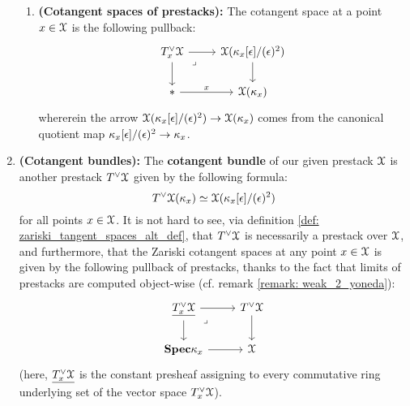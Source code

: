 \begin{definition}
\begin{enumerate}
\begin{enumerate}
                                \item \textbf{(Cotangent spaces of prestacks):} The cotangent space at a point $x \in \mathcal{X}$ is the following pullback:
                                    $$
                                        \begin{tikzcd}
                                        	{T^{\vee}_x\calX} & {\calX(\kappa_x[\e]/(\e)^2)} \\
                                        	{*} & {\calX(\kappa_x)}
                                        	\arrow["x", from=2-1, to=2-2]
                                        	\arrow[from=1-1, to=2-1]
                                        	\arrow[from=1-1, to=1-2]
                                        	\arrow[from=1-2, to=2-2]
                                        	\arrow["\lrcorner"{anchor=center, pos=0.125}, draw=none, from=1-1, to=2-2]
                                        \end{tikzcd}
                                    $$
                                whererein the arrow $\mathcal{X}(\kappa_x[\epsilon]/(\epsilon)^2) \to \mathcal{X}(\kappa_x)$ comes from the canonical quotient map $\kappa_x[\epsilon]/(\epsilon)^2 \to \kappa_x$.
                            \end{enumerate}
                        \item \textbf{(Cotangent bundles):} The \textbf{cotangent bundle} of our given prestack $\mathcal{X}$ is another prestack $T^{\vee}\mathcal{X}$ given by the following formula:
                            $$T^{\vee}\mathcal{X}(\kappa_x) \simeq \mathcal{X}(\kappa_x[\epsilon]/(\epsilon)^2)$$
                        for all points $x \in \mathcal{X}$. It is not hard to see, via definition \ref{def: zariski_tangent_spaces_alt_def}, that $T^{\vee}\mathcal{X}$ is necessarily a prestack over $\mathcal{X}$, and furthermore, that the Zariski cotangent spaces at any point $x \in \mathcal{X}$ is given by the following pullback of prestacks, thanks to the fact that limits of prestacks are computed object-wise (cf. remark \ref{remark: weak_2_yoneda}):
                            $$
                                \begin{tikzcd}
                                	{\underline{T^{\vee}_x\calX}} & {T^{\vee}\calX} \\
                                	{\Spec \kappa_x} & \calX
                                	\arrow[from=1-2, to=2-2]
                                	\arrow[from=2-1, to=2-2]
                                	\arrow[from=1-1, to=1-2]
                                	\arrow[from=1-1, to=2-1]
                                	\arrow["\lrcorner"{anchor=center, pos=0.125}, draw=none, from=1-1, to=2-2]
                                \end{tikzcd}
                            $$
                        (here, $\underline{T^{\vee}_x\mathcal{X}}$ is the constant presheaf assigning to every commutative ring underlying set of the vector space $T^{\vee}_x\mathcal{X}$).
                    \end{enumerate}
            \end{definition}
